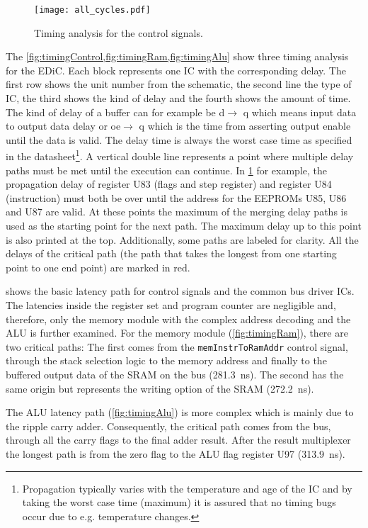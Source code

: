 \begin{figure}[t]
  \centering
  \texttt{[image: all\_cycles.pdf]}
  \caption{Timing analysis for the control signals.}
  \label{fig:timingControl}
\end{figure}
The \cref{fig:timingControl,fig:timingRam,fig:timingAlu} show three timing analysis for the \gls{EDiC}.
Each block represents one \gls{IC} with the corresponding delay.
The first row shows the unit number from the schematic, the second line the type of \gls{IC}, the third shows the kind of delay and the fourth shows the amount of time.
The kind of delay of a buffer can for example be d$\rightarrow$ q which means input data to output data delay or oe$\rightarrow$ q which is the time from asserting output enable until the data is valid.
The delay time is always the worst case time as specified in the datasheet\footnote{Propagation typically varies with the temperature and age of the \gls{IC} and by taking the worst case time (maximum) it is assured that no timing bugs occur due to e.g. temperature changes.}.
A vertical double line represents a point where multiple delay paths must be met until the execution can continue.
In \cref{fig:timingControl} for example, the propagation delay of register U83 (flags and step register) and register U84 (instruction) must both be over until the address for the \glspl{EEPROM} U85, U86 and U87 are valid.
At these points the maximum of the merging delay paths is used as the starting point for the next path.
The maximum delay up to this point is also printed at the top.
Additionally, some paths are labeled for clarity.
All the delays of the critical path (the path that takes the longest from one starting point to one end point) are marked in red.

 shows the basic latency path for control signals and the common bus driver \glspl{IC}.
The latencies inside the register set and program counter are negligible and, therefore, only the memory module with the complex address decoding and the \gls{ALU} is further examined.
For the memory module (\cref{fig:timingRam}), there are two critical paths:
The first comes from the \texttt{memInstrToRamAddr} control signal, through the stack selection logic to the memory address and finally to the buffered output data of the \gls{SRAM} on the bus (\qty{281.3}{\nano\second}).
The second has the same origin but represents the writing option of the \gls{SRAM} (\qty{272.2}{\nano\second}).

The \gls{ALU} latency path (\cref{fig:timingAlu}) is more complex which is mainly due to the ripple carry adder.
Consequently, the critical path comes from the bus, through all the carry flags to the final adder result.
After the result multiplexer the longest path is from the zero flag to the \gls{ALU} flag register U97 (\qty{313.9}{\nano\second}).

